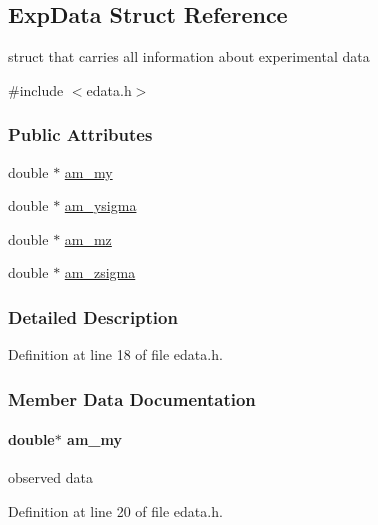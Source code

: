 \hypertarget{struct_exp_data}{}\subsection{Exp\+Data Struct Reference}
\label{struct_exp_data}


struct that carries all information about experimental data  




{\ttfamily \#include $<$edata.\+h$>$}

\subsubsection*{Public Attributes}
\begin{DoxyCompactItemize}
\item 
double $\ast$ \hyperlink{struct_exp_data_a1853cfbbd72291b3c37df42b7f07d513}{am\+\_\+my}
\item 
double $\ast$ \hyperlink{struct_exp_data_af29a27d415ab3b3f165e86473412baad}{am\+\_\+ysigma}
\item 
double $\ast$ \hyperlink{struct_exp_data_a847258093bc307817a8c9cedc3f5edc3}{am\+\_\+mz}
\item 
double $\ast$ \hyperlink{struct_exp_data_a806c9883d66f002acdcceaeda3e57fb2}{am\+\_\+zsigma}
\end{DoxyCompactItemize}


\subsubsection{Detailed Description}


Definition at line 18 of file edata.\+h.



\subsubsection{Member Data Documentation}
\hypertarget{struct_exp_data_a1853cfbbd72291b3c37df42b7f07d513}{}
\paragraph[{am\+\_\+my}]{\setlength{\rightskip}{0pt plus 5cm}double$\ast$ am\+\_\+my}\label{struct_exp_data_a1853cfbbd72291b3c37df42b7f07d513}
observed data 

Definition at line 20 of file edata.\+h.

